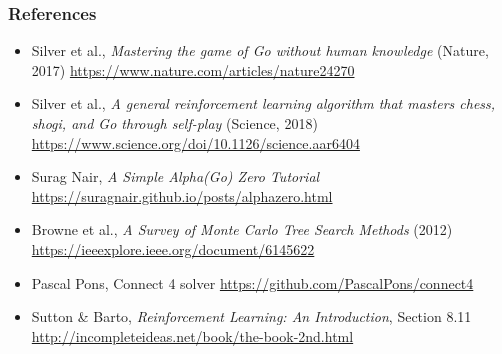 

\begin{frame}
    \frametitle{References}
    \small
    \begin{itemize}
        \item Silver et al., \textit{Mastering the game of Go without human knowledge} (Nature, 2017)
        \url{https://www.nature.com/articles/nature24270}

        \item Silver et al., \textit{A general reinforcement learning algorithm that masters chess,
        shogi, and Go through self-play} (Science, 2018)
        \url{https://www.science.org/doi/10.1126/science.aar6404}

        \item Surag Nair, \textit{A Simple Alpha(Go) Zero Tutorial}
        \url{https://suragnair.github.io/posts/alphazero.html}

        \item Browne et al., \textit{A Survey of Monte Carlo Tree Search Methods} (2012)
        \url{https://ieeexplore.ieee.org/document/6145622}

        \item Pascal Pons, Connect 4 solver
        \url{https://github.com/PascalPons/connect4}

        \item Sutton \& Barto, \textit{Reinforcement Learning: An Introduction}, Section 8.11
        \url{http://incompleteideas.net/book/the-book-2nd.html}
    \end{itemize}
\end{frame}


